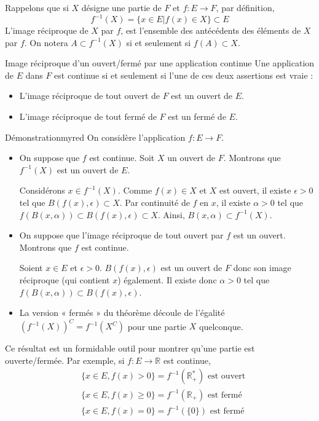     Rappelons que si $X$ désigne une partie de $F$ et $f : E \rightarrow F$, par définition,
    \[ f^{-1}(X) = \big\{ x \in E \big| f(x) \in X \big\} \subset E \]
    L’image réciproque de $X$ par $f$, est l’ensemble des antécédents des éléments de $X$ par $f$. On notera $A \subset f^{-1}(X)$ si et seulement si $f(A) \subset X$.

    \begin{theo}{Image réciproque d’un ouvert/fermé par une application continue}{}
        Une application de $E$ dans $F$ est continue si et seulement si l’une de ces deux assertions est vraie : 
        \begin{itemize}
            \item L’image réciproque de tout ouvert de $F$ est un ouvert de $E$.
            \item L’image réciproque de tout fermé de $F$ est un fermé de $E$.
        \end{itemize}
    \end{theo}

    \begin{demo}{Démonstration}{myred}
        On considère l’application $f : E \rightarrow F$.
        \begin{itemize}
            \item On suppose que $f$ est continue. Soit $X$ un ouvert de $F$. Montrons que $f^{-1}(X)$ est un ouvert de $E$.
            
            Considérons $x \in f^{-1}(X)$. Comme $f(x) \in X$ et $X$ est ouvert, il existe $\epsilon > 0$ tel que $B(f(x),\epsilon) \subset X$. Par continuité de $f$ en $x$, il existe $\alpha > 0$ tel que $f(B(x,\alpha)) \subset B(f(x),\epsilon) \subset X$. Ainsi, $B(x,\alpha) \subset f^{-1}(X)$.
            \item On suppose que l’image réciproque de tout ouvert par $f$ est un ouvert. Montrons que $f$ est continue.
            
            Soient $x \in E$ et $\epsilon > 0$. $B(f(x),\epsilon)$ est un ouvert de $F$ donc son image réciproque (qui contient $x$) également. Il existe donc $\alpha > 0$ tel que $f(B(x,\alpha)) \subset B(f(x),\epsilon)$.
            \item La version « fermés » du théorème découle de l’égalité $\left(f^{-1}(X)\right)^C = f^{-1}(X^C)$ pour une partie $X$ quelconque.
        \end{itemize}
    \end{demo}

    Ce résultat est un formidable outil pour montrer qu’une partie est ouverte/fermée. Par exemple, si $f : E \rightarrow \mathbb{R}$ est continue,
    \begin{align*}
        & \big\{ x \in E, f(x) > 0 \big\} = f^{-1}\left(\mathbb{R}_+^*\right) \text{ est ouvert} \\
        & \big\{ x \in E, f(x) \geq 0 \big\} = f^{-1}\left(\mathbb{R}_+\right) \text{ est fermé} \\
        &\big\{ x \in E, f(x) = 0 \big\} = f^{-1}\left(\{ 0 \}\right) \text{ est fermé}
    \end{align*}

